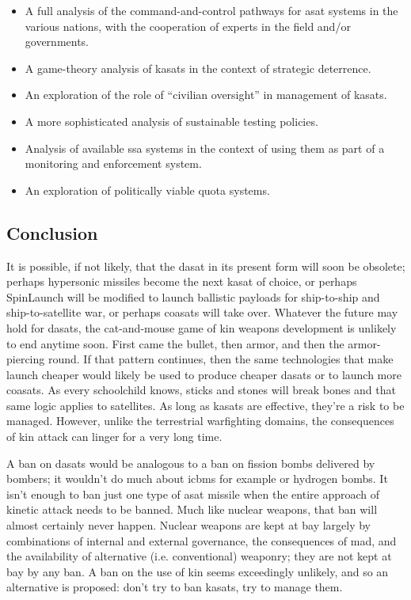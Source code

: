\begin{itemize}

\item A full analysis of the command-and-control pathways for asat
  systems in the various nations, with the cooperation of experts in
  the field and/or governments.

\item A game-theory analysis of \acp{kasat} in the context of
  strategic deterrence.

\item An exploration of the role of ``civilian oversight'' in
  management of \acp{kasat}.

\item A more sophisticated analysis of sustainable testing policies.

\item Analysis of available \ac{ssa} systems in the context of using
  them as part of a monitoring and enforcement system.

\item An exploration of politically viable quota systems.

\end{itemize}


\subsection{Conclusion}

It is possible, if not likely, that the \ac{dasat} in its present form
will soon be obsolete; perhaps hypersonic missiles become the next
\ac{kasat} of choice, or perhaps SpinLaunch will be modified to launch
ballistic payloads for ship-to-ship and ship-to-satellite war, or
perhaps \acp{coasat} will take over.  Whatever the future may hold for
\acp{dasat}, the cat-and-mouse game of \ac{kin} weapons development is
unlikely to end anytime soon.  First came the bullet, then armor, and
then the armor-piercing round.  If that pattern continues, then the
same technologies that make launch cheaper would likely be used to
produce cheaper \acp{dasat} or to launch more \acp{coasat}.  As every
schoolchild knows, sticks and stones will break bones and that same
logic applies to satellites.  As long as \acp{kasat} are effective,
they're a risk to be managed.  However, unlike the terrestrial
warfighting domains, the consequences of \ac{kin} attack can linger
for a very long time.

A ban on \aclp{dasat} would be analogous to a ban on fission bombs
delivered by bombers; it wouldn't do much about \acp{icbm} for example
or hydrogen bombs.  It isn't enough to ban just one type of \ac{asat}
missile when the entire approach of kinetic attack needs to be banned.
Much like nuclear weapons, that ban will almost certainly never
happen.  Nuclear weapons are kept at bay largely by combinations of
internal and external governance, the consequences of \ac{mad}, and
the availability of alternative (i.e. conventional) weaponry; they are
not kept at bay by any ban.  A ban on the use of \ac{kin} seems
exceedingly unlikely, and so an alternative is proposed: don't try to
ban \acp{kasat}, try to manage them.

